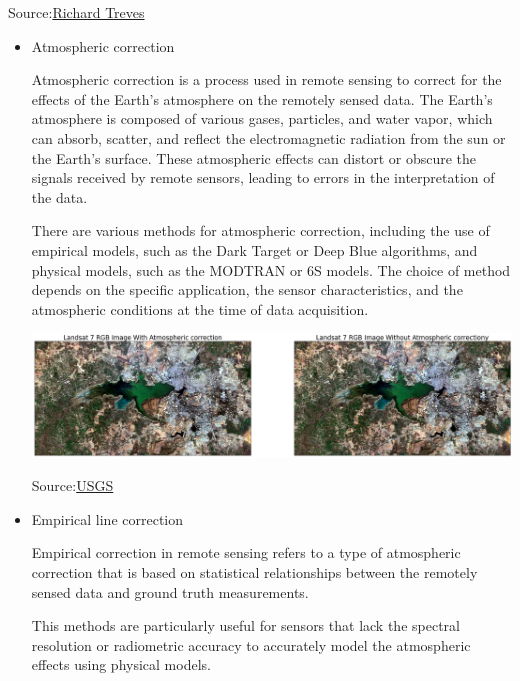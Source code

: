 \documentclass[
  letterpaper,
  DIV=11,
  numbers=noendperiod]{scrreprt}
\begin{document}
Source:\href{https://www2.geog.soton.ac.uk/users/trevesr/obs/rseo/geometric_correction.html}{Richard
Treves}

\begin{itemize}
\item
  Atmospheric correction

  Atmospheric correction is a process used in remote sensing to correct
  for the effects of the Earth's atmosphere on the remotely sensed data.
  The Earth's atmosphere is composed of various gases, particles, and
  water vapor, which can absorb, scatter, and reflect the
  electromagnetic radiation from the sun or the Earth's surface. These
  atmospheric effects can distort or obscure the signals received by
  remote sensors, leading to errors in the interpretation of the data.

  There are various methods for atmospheric correction, including the
  use of empirical models, such as the Dark Target or Deep Blue
  algorithms, and physical models, such as the MODTRAN or 6S models. The
  choice of method depends on the specific application, the sensor
  characteristics, and the atmospheric conditions at the time of data
  acquisition.

  \includegraphics{./images/paste-6860930B.png}

  Source:\href{https://medium.com/nerd-for-tech/atmospheric-correction-of-satellite-images-using-python-42128504afc3}{USGS}
\item
  Empirical line correction

  Empirical correction in remote sensing refers to a type of atmospheric
  correction that is based on statistical relationships between the
  remotely sensed data and ground truth measurements.

  This methods are particularly useful for sensors that lack the
  spectral resolution or radiometric accuracy to accurately model the
  atmospheric effects using physical models.


\end{itemize}
\end{document}

